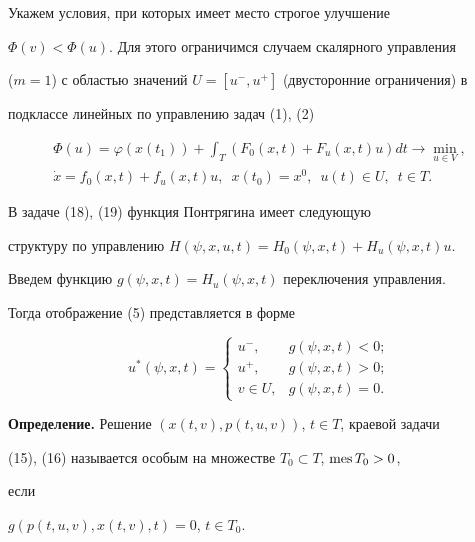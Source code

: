 Укажем условия, при которых имеет место строгое улучшение 


$\Phi(v)<\Phi(u)$. Для этого ограничимся случаем скалярного управления


($m=1$) с областью значений $U=[u^-,u^+]$ (двусторонние ограничения) в 


подклассе линейных по управлению задач (1), (2) 


\begin{gather}


\Phi(u)=\varphi(x(t_1))+\int_T (F_0(x,t)+F_u(x,t)u)dt


\to \min_{u\in V}, \\


\Dot x=f_0(x,t)+f_u(x,t)u,\ \; x(t_0)=x^0,


\ \; u(t)\in U, \ \; t\in T.


\end{gather}





В задаче (18), (19) функция Понтрягина имеет следующую


структуру по управлению $H(\psi,x,u,t)=H_0(\psi,x,t)+H_u(\psi,x,t)u$.





Введем функцию $g(\psi,x,t)=H_u(\psi,x,t)$ переключения управления.


Тогда отображение (5) представляется в форме


$$


u^*(\psi,x,t)=


\begin{cases}


u^-, & g(\psi,x,t)<0;\\


u^+, & g(\psi,x,t)>0;\\


v\in U, & g(\psi,x,t)=0.


\end{cases}


$$





{\bf Определение.} Решение $(x(t,v),p(t,u,v))$, $t\in T$, краевой задачи


(15), (16) называется особым на множестве $T_0\subset T$, $\operatorname{mes} T_0>0$, 


если 


$g(p(t,u,v),x(t,v),t)=0$, $t\in T_0$.


\medskip






